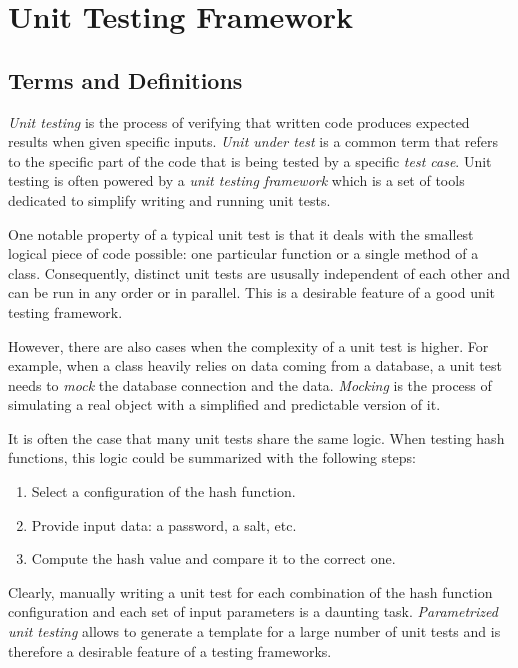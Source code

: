 \chapter{Unit Testing Framework}
\label{chapter:unit-testing-framework}

\section{Terms and Definitions}

\emph{Unit testing} is the process of verifying that written code produces expected results when given specific inputs. \emph{Unit under test} is a common term that refers to the specific part of the code that is being tested by a specific \emph{test case}. Unit testing is often powered by a \emph{unit testing framework} which is a set of tools dedicated to simplify writing and running unit tests.

One notable property of a typical unit test is that it deals with the smallest logical piece of code possible: one particular function or a single method of a class. Consequently, distinct unit tests are ususally independent of each other and can be run in any order or in parallel. This is a desirable feature of a good unit testing framework.

However, there are also cases when the complexity of a unit test is higher. For example, when a class heavily relies on data coming from a database, a unit test needs to \emph{mock} the database connection and the data. \emph{Mocking} is the process of simulating a real object with a simplified and predictable version of it.

It is often the case that many unit tests share the same logic. When testing hash functions, this logic could be summarized with the following steps:

\begin{enumerate}
    \item Select a configuration of the hash function.
    \item Provide input data: a password, a salt, etc.
    \item Compute the hash value and compare it to the correct one.
   \end{enumerate}

Clearly, manually writing a unit test for each combination of the hash function configuration and each set of input parameters is a daunting task. \emph{Parametrized unit testing} allows to generate a template for a large number of unit tests and is therefore a desirable feature of a testing frameworks.

